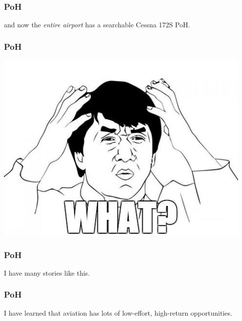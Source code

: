 \begin{frame}
\frametitle{PoH}
\begin{center}
and now the \emph{entire airport} has a searchable Cessna 172S PoH.
\end{center}
\end{frame}

\begin{frame}
\frametitle{PoH}
\begin{center}
\includegraphics[height=0.4\textheight]{image/what.jpg}
\end{center}
\end{frame}

\begin{frame}
\frametitle{PoH}
\begin{center}
I have many stories like this.
\end{center}
\end{frame}

\begin{frame}
\frametitle{PoH}
\begin{center}
I have learned that aviation has lots of low-effort, high-return opportunities.
\end{center}
\end{frame}
